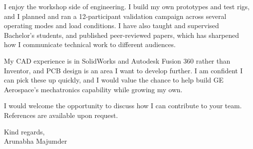 \documentclass[10pt,a4paper]{article}
\begin{document}
I enjoy the workshop side of engineering. I build my own prototypes and test rigs, and I planned and ran a 12-participant validation campaign across several operating modes and load conditions. I have also taught and supervised Bachelor's students, and published peer-reviewed papers, which has sharpened how I communicate technical work to different audiences.

My CAD experience is in SolidWorks and Autodesk Fusion 360 rather than Inventor, and PCB design is an area I want to develop further. I am confident I can pick these up quickly, and I would value the chance to help build GE Aerospace's mechatronics capability while growing my own.

I would welcome the opportunity to discuss how I can contribute to your team. References are available upon request.

Kind regards,\\
Arunabha Majumder
\end{document}
